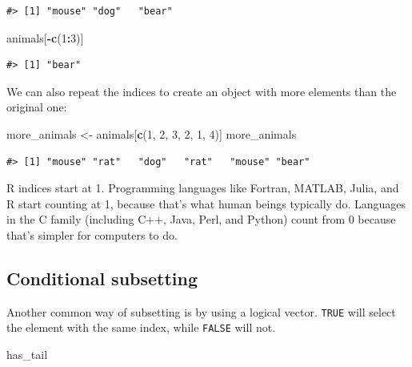 \documentclass[]{book}
\newenvironment{Shaded}{\begin{snugshade}}{\end{snugshade}}
\newcommand{\KeywordTok}[1]{\textcolor[rgb]{0.13,0.29,0.53}{\textbf{#1}}}
\newcommand{\DecValTok}[1]{\textcolor[rgb]{0.00,0.00,0.81}{#1}}
\newcommand{\StringTok}[1]{\textcolor[rgb]{0.31,0.60,0.02}{#1}}
\newcommand{\OperatorTok}[1]{\textcolor[rgb]{0.81,0.36,0.00}{\textbf{#1}}}
\newcommand{\NormalTok}[1]{#1}
\theoremstyle{definition}
\theoremstyle{definition}
\theoremstyle{remark}
\begin{document}
\begin{verbatim}
#> [1] "mouse" "dog"   "bear"
\end{verbatim}

\begin{Shaded}
\begin{Highlighting}[]
\NormalTok{animals[}\OperatorTok{-}\KeywordTok{c}\NormalTok{(}\DecValTok{1}\OperatorTok{:}\DecValTok{3}\NormalTok{)]}
\end{Highlighting}
\end{Shaded}

\begin{verbatim}
#> [1] "bear"
\end{verbatim}

We can also repeat the indices to create an object with more elements
than the original one:

\begin{Shaded}
\begin{Highlighting}[]
\NormalTok{more_animals <-}\StringTok{ }\NormalTok{animals[}\KeywordTok{c}\NormalTok{(}\DecValTok{1}\NormalTok{, }\DecValTok{2}\NormalTok{, }\DecValTok{3}\NormalTok{, }\DecValTok{2}\NormalTok{, }\DecValTok{1}\NormalTok{, }\DecValTok{4}\NormalTok{)]}
\NormalTok{more_animals}
\end{Highlighting}
\end{Shaded}

\begin{verbatim}
#> [1] "mouse" "rat"   "dog"   "rat"   "mouse" "bear"
\end{verbatim}

R indices start at 1. Programming languages like Fortran, MATLAB, Julia,
and R start counting at 1, because that's what human beings typically
do. Languages in the C family (including C++, Java, Perl, and Python)
count from 0 because that's simpler for computers to do.

\subsection{Conditional subsetting}\label{conditional-subsetting}

Another common way of subsetting is by using a logical vector.
\texttt{TRUE} will select the element with the same index, while
\texttt{FALSE} will not.

\begin{Shaded}
\begin{Highlighting}[]
\NormalTok{has_tail}
\end{Highlighting}
\end{Shaded}
\end{document}
